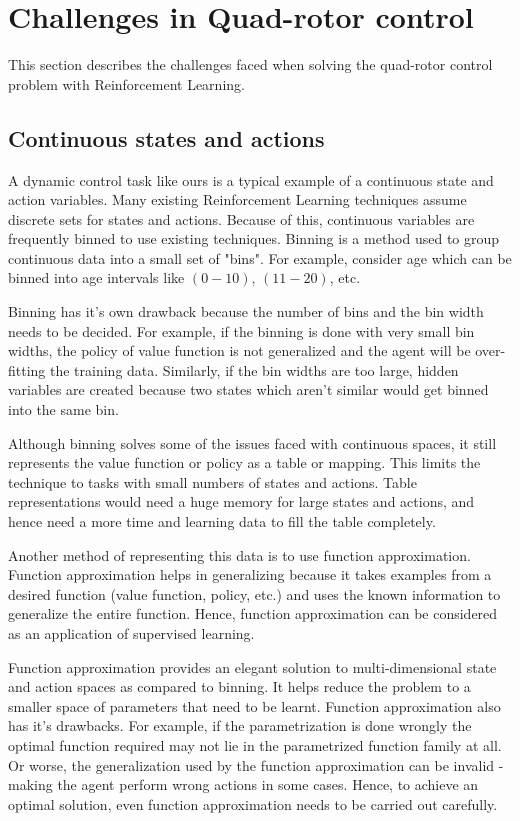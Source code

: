\documentclass[hidelinks,BTech]{iitmdiss}
\begin{document}
\section{Challenges in Quad-rotor control}

This section describes the challenges faced when solving the quad-rotor control problem with Reinforcement Learning.

\subsection{Continuous states and actions}

A dynamic control task like ours is a typical example of a continuous state and action variables. Many existing Reinforcement Learning techniques assume discrete sets for states and actions. Because of this, continuous variables are frequently binned to use existing techniques. Binning is a method used to group continuous data into a small set of "bins". For example, consider age which can be binned into age intervals like $(0-10)$, $(11-20)$, etc.

Binning has it's own drawback because the number of bins and the bin width needs to be decided. For example, if the binning is done with very small bin widths, the policy of value function is not generalized and the agent will be over-fitting the training data. Similarly, if the bin widths are too large, hidden variables are created because two states which aren't similar would get binned into the same bin.

Although binning solves some of the issues faced with continuous spaces, it still represents the value function or policy as a table or mapping. This limits the technique to tasks with small numbers of states and actions. Table representations would need a huge memory for large states and actions, and hence need a more time and learning data to fill the table completely.

Another method of representing this data is to use function approximation. Function approximation helps in generalizing because it takes examples from a desired function (value function, policy, etc.) and uses the known information to generalize the entire function. Hence, function approximation can be considered as an application of supervised learning.

Function approximation provides an elegant solution to multi-dimensional state and action spaces as compared to binning. It helps reduce the problem to a smaller space of parameters that need to be learnt. Function approximation also has it's drawbacks. For example, if the parametrization is done wrongly the optimal function required may not lie in the parametrized function family at all. Or worse, the generalization used by the function approximation can be invalid - making the agent perform wrong actions in some cases. Hence, to achieve an optimal solution, even function approximation needs to be carried out carefully.
\end{document}
